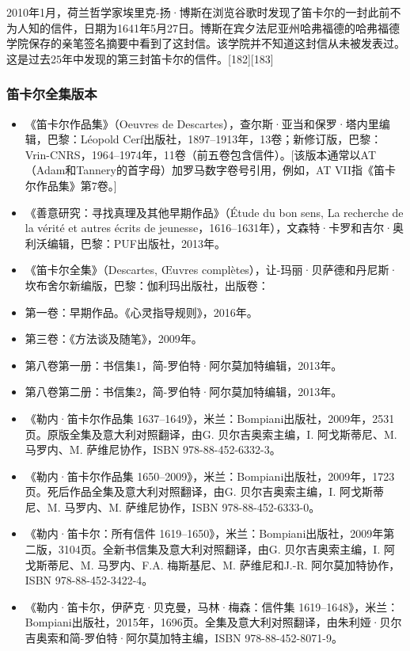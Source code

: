 2010年1月，荷兰哲学家埃里克-扬·博斯在浏览谷歌时发现了笛卡尔的一封此前不为人知的信件，日期为1641年5月27日。博斯在宾夕法尼亚州哈弗福德的哈弗福德学院保存的亲笔签名摘要中看到了这封信。该学院并不知道这封信从未被发表过。这是过去25年中发现的第三封笛卡尔的信件。[182][183]
\subsubsection{笛卡尔全集版本}

\begin{itemize}
\item 《笛卡尔作品集》（Oeuvres de Descartes），查尔斯·亚当和保罗·塔内里编辑，巴黎：Léopold Cerf出版社，1897–1913年，13卷；新修订版，巴黎：Vrin-CNRS，1964–1974年，11卷（前五卷包含信件）。[该版本通常以AT（Adam和Tannery的首字母）加罗马数字卷号引用，例如，AT VII指《笛卡尔作品集》第7卷。]
\item 《善意研究：寻找真理及其他早期作品》（Étude du bon sens, La recherche de la vérité et autres écrits de jeunesse，1616–1631年），文森特·卡罗和吉尔·奥利沃编辑，巴黎：PUF出版社，2013年。
\item 《笛卡尔全集》（Descartes, Œuvres complètes），让-玛丽·贝萨德和丹尼斯·坎布舍尔新编版，巴黎：伽利玛出版社，出版卷：
\item 第一卷：早期作品。《心灵指导规则》，2016年。
\item 第三卷：《方法谈及随笔》，2009年。
\item 第八卷第一册：书信集1，简-罗伯特·阿尔莫加特编辑，2013年。
\item 第八卷第二册：书信集2，简-罗伯特·阿尔莫加特编辑，2013年。
\item 《勒内·笛卡尔作品集 1637–1649》，米兰：Bompiani出版社，2009年，2531页。原版全集及意大利对照翻译，由G. 贝尔吉奥索主编，I. 阿戈斯蒂尼、M. 马罗内、M. 萨维尼协作，ISBN 978-88-452-6332-3。
\item 《勒内·笛卡尔作品集 1650–2009》，米兰：Bompiani出版社，2009年，1723页。死后作品全集及意大利对照翻译，由G. 贝尔吉奥索主编，I. 阿戈斯蒂尼、M. 马罗内、M. 萨维尼协作，ISBN 978-88-452-6333-0。
\item 《勒内·笛卡尔：所有信件 1619–1650》，米兰：Bompiani出版社，2009年第二版，3104页。全新书信集及意大利对照翻译，由G. 贝尔吉奥索主编，I. 阿戈斯蒂尼、M. 马罗内、F.A. 梅斯基尼、M. 萨维尼和J.-R. 阿尔莫加特协作，ISBN 978-88-452-3422-4。
\item 《勒内·笛卡尔，伊萨克·贝克曼，马林·梅森：信件集 1619–1648》，米兰：Bompiani出版社，2015年，1696页。全集及意大利对照翻译，由朱利娅·贝尔吉奥索和简-罗伯特·阿尔莫加特主编，ISBN 978-88-452-8071-9。
\end{itemize}
